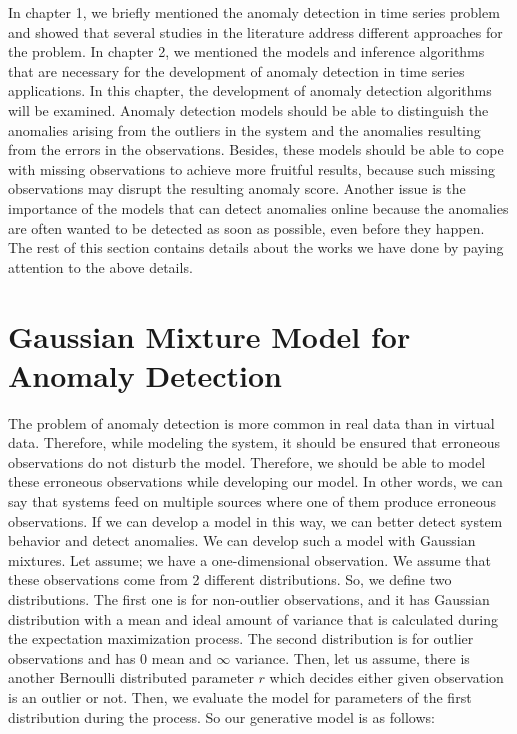 In chapter 1, we briefly mentioned the anomaly detection in time series problem and showed that several studies in the literature address different approaches for the problem. 
In chapter 2, we mentioned the models and inference algorithms that are necessary for the development of anomaly detection in time series applications. 
In this chapter, the development of anomaly detection algorithms will be examined. 
Anomaly detection models should be able to distinguish the anomalies arising from the outliers in the system and the anomalies resulting from the errors in the observations.
Besides, these models should be able to cope with missing observations to achieve more fruitful results, because such missing observations may disrupt the resulting anomaly score.
Another issue is the importance of the models that can detect anomalies online because the anomalies are often wanted to be detected as soon as possible, even before they happen.
The rest of this section contains details about the works we have done by paying attention to the above details.

\section{Gaussian Mixture Model for Anomaly Detection}

The problem of anomaly detection is more common in real data than in virtual data. 
Therefore, while modeling the system, it should be ensured that erroneous observations do not disturb the model. 
Therefore, we should be able to model these erroneous observations while developing our model.
In other words, we can say that systems feed on multiple sources where one of them produce erroneous observations.
If we can develop a model in this way, we can better detect system behavior and detect anomalies.
We can develop such a model with Gaussian mixtures.
Let assume; we have a one-dimensional observation. We assume that these observations come from 2 different distributions.
So, we define two distributions. The first one is for non-outlier observations, and it has Gaussian distribution with a mean and ideal amount of variance that is calculated during the expectation maximization process. The second distribution is for outlier observations and has $0$ mean and $\infty$ variance. Then, let us assume, there is another Bernoulli distributed parameter $r$ which decides either given observation is an outlier or not. 
Then, we evaluate the model for parameters of the first distribution during the process. So our generative model is as follows:

